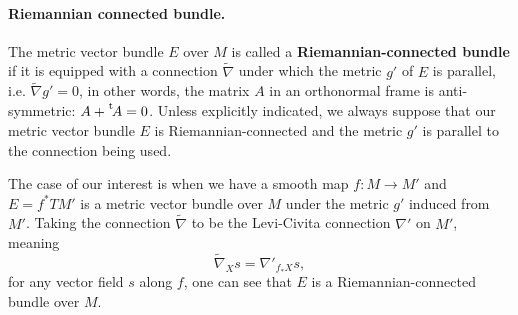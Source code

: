 \paragraph{Riemannian connected bundle.}
\label{sec:org7d4f735}
The metric vector bundle \(E\) over \(M\) is called a \textbf{Riemannian-connected bundle} if
it is equipped with a connection \(\tilde \nabla\) under which the metric \(g'\) of \(E\) is
parallel, i.e. \(\tilde\nabla g' = 0\), in other words, the matrix \(A\) in an
orthonormal frame is anti-symmetric: \(A + \mskip1mu\prescript{\smash{\mathrm t\mkern-3mu}}{}{\mathstrut A} = 0\). Unless explicitly
indicated, we always suppose that our metric vector bundle \(E\) is Riemannian-connected
and the metric \(g'\) is parallel to the connection being used.


\begin{exampl}
\label{ex:pullback-tangent}
The case of our interest is when we have a smooth map \(f: M \longrightarrow M'\) and
\(E = f^*TM'\) is a metric vector bundle over \(M\) under the metric \(g'\) induced
from \(M'\). Taking the connection \(\tilde\nabla\) to be the Levi-Civita connection \(\nabla'\)
on \(M'\), meaning
\[
 \tilde\nabla_X s = \nabla'_{f_*X}s,
\]
for any vector field \(s\) along \(f\), one can see that \(E\) is a
Riemannian-connected bundle over \(M\).
\end{exampl}


